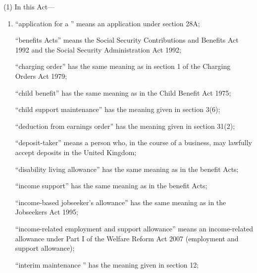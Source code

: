 \documentclass[12pt,a4paper]{article}
\begin{document}
(1) In this Act---
\begin{enumerate}\item[]

“application for a ” means an application under section 28A;


“benefits Acts” means the Social Security Contributions and Benefits Act
1992 and the Social Security Administration Act 1992;

“charging order” has the same meaning as in section 1 of the Charging Orders Act 1979;

“child benefit” has the same meaning as in the Child Benefit Act 1975;

“child support maintenance” has the meaning given in section 3(6);


“deduction from earnings order” has the meaning given in section 31(2);



“deposit-taker” means a person who, in the course of a business, may lawfully accept deposits in the United Kingdom;

“disability living allowance” has the same meaning as in the benefit Acts;


“income support” has the same meaning as in the benefit Acts;

“income-based jobseeker’s allowance” has the same meaning as in the
Jobseekers Act 1995;

“income-related employment and support allowance” means an income-related
allowance under Part I of the Welfare Reform Act 2007 (employment and support
allowance);

“interim maintenance ” has the meaning given in section
12;


\end{enumerate}
\end{document}
